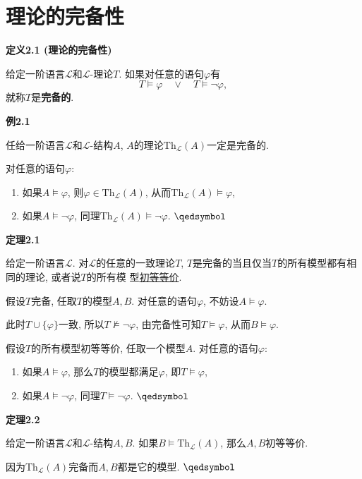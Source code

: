 \documentclass[UTF8]{ctexart}
\begin{document}
\newpage

\section{理论的完备性}

\hypertarget{sec:定义2.1}{}
\noindent\textbf{定义2.1 (理论的完备性)}

给定一阶语言$\mathcal{L}$和$\mathcal{L}$-理论$T$. 如果对任意的语句$\varphi$有
\[
    T\models\varphi\quad\lor\quad T\models\neg\varphi,
\]
就称$T$是\textbf{完备的}.

\vspace{10pt}

\hypertarget{sec:例2.1}{}
\noindent\textbf{例2.1}

任给一阶语言$\mathcal{L}$和$\mathcal{L}$-结构$A$,
$A$的理论$\mathrm{Th}_{\mathcal{L}}(A)$一定是完备的.


对任意的语句$\varphi$:
\begin{enumerate}
    \item 如果$A\models\varphi$, 则$\varphi\in\mathrm{Th}_{\mathcal{L}}(A)$,
    从而$\mathrm{Th}_{\mathcal{L}}(A)\models\varphi$,
    \item 如果$A\models\neg\varphi$,
    同理$\mathrm{Th}_{\mathcal{L}}(A)\models\neg\varphi$. \hfill $\qedsymbol$
\end{enumerate}

\vspace{10pt}

\hypertarget{sec:定理2.1}{}
\noindent\textbf{定理2.1}

给定一阶语言$\mathcal{L}$. 对$\mathcal{L}$的任意的一致理论$T$,
$T$是完备的当且仅当$T$的所有模型都有相同的理论, 或者说$T$的所有模
型\href{../04 Löwenheim-Skolem 定理/02 初等等价#nameddest=sec:定义1.1}{初等等价}.



假设$T$完备, 任取$T$的模型$A,B$. 对任意的语句$\varphi$, 不妨设$A\models\varphi$.

此时$T\cup\{\varphi\}$一致, 所以$T\not\models\neg\varphi$,
由完备性可知$T\models\varphi$, 从而$B\models\varphi$.


假设$T$的所有模型初等等价, 任取一个模型$A$. 对任意的语句$\varphi$:
\begin{enumerate}
    \item 如果$A\models\varphi$, 那么$T$的模型都满足$\varphi$, 即$T\models\varphi$,
    \item 如果$A\models\neg\varphi$, 同理$T\models\neg\varphi$. \hfill $\qedsymbol$
\end{enumerate}

\vspace{10pt}

\hypertarget{sec:定理2.2}{}
\noindent\textbf{定理2.2}

给定一阶语言$\mathcal{L}$和$\mathcal{L}$-结构$A,B$.
如果$B\models\mathrm{Th}_{\mathcal{L}}(A)$, 那么$A,B$初等等价.


因为$\mathrm{Th}_{\mathcal{L}}(A)$完备而$A,B$都是它的模型. \hfill $\qedsymbol$
\end{document}
